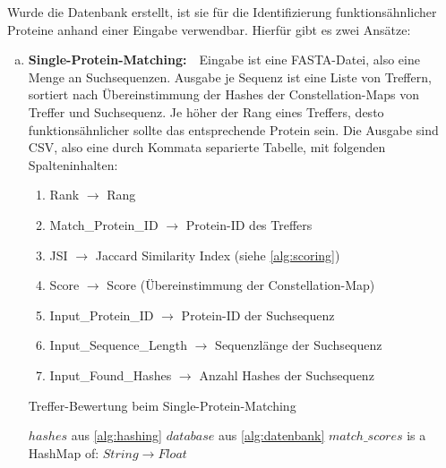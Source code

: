         Wurde die Datenbank erstellt, ist sie für die Identifizierung funktionsähnlicher Proteine anhand einer Eingabe verwendbar. Hierfür gibt es zwei Ansätze:
        \begin{enumerate}[a)]
            \item {}
                \textbf{Single-Protein-Matching:}\ \ Eingabe ist eine FASTA-Datei, also eine Menge an Suchsequenzen. Ausgabe je Sequenz ist eine Liste von Treffern, sortiert nach Übereinstimmung der Hashes der Constellation-Maps von Treffer und Suchsequenz. Je höher der Rang eines Treffers, desto funktionsähnlicher sollte das entsprechende Protein sein. Die Ausgabe sind \ac{CSV}, also eine durch Kommata separierte Tabelle, mit folgenden Spalteninhalten:
                \begin{enumerate}[1.]
                    \item Rank $\rightarrow$ Rang
                    \item Match\_Protein\_ID $\rightarrow$ Protein-ID des Treffers
                    \item JSI $\rightarrow$ Jaccard Similarity Index (siehe \autoref{alg:scoring})
                    \item Score $\rightarrow$ Score (Übereinstimmung der Constellation-Map)
                    \item Input\_Protein\_ID $\rightarrow$ Protein-ID der Suchsequenz
                    \item Input\_Sequence\_Length $\rightarrow$ Sequenzlänge der Suchsequenz
                    \item Input\_Found\_Hashes $\rightarrow$ Anzahl Hashes der Suchsequenz
                \end{enumerate}

                \newcommand{\Width}{\dimexpr\textwidth-\leftmargin}
                \begin{minipage}{\Width}
                    \begin{algorithm}[H]
                        \caption{Treffer-Bewertung beim Single-Protein-Matching}\label{alg:scoring}
                        \begin{algorithmic}[1]
                            \Require $hashes$ aus \autoref{alg:hashing}
                            \Require $database$ aus \autoref{alg:datenbank}
                            \Ensure $match\_scores$ is a HashMap of: $String \rightarrow Float$


\end{algorithmic}
\end{algorithm}
\end{minipage}
\end{enumerate}
